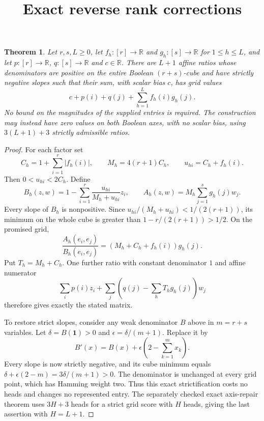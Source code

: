 \documentclass[11pt]{article}
\newtheorem{theorem}{Theorem}
\begin{document}
\title{Exact reverse rank corrections}
\author{}
\date{}
\maketitle

\begin{theorem}
Let $r,s,L\geq0$, let $f_h:[r]\to\mathbb R$ and
$g_h:[s]\to\mathbb R$ for $1\leq h\leq L$, and let
$p:[r]\to\mathbb R$, $q:[s]\to\mathbb R$ and $c\in\mathbb R$.
There are $L+1$ affine ratios whose denominators are positive on the
entire Boolean $(r+s)$-cube and have strictly negative slopes such that
 their sum, with scalar bias $c$, has grid values
\[
 c+p(i)+q(j)+\sum_{h=1}^L f_h(i)g_h(j).
\]
No bound on the magnitudes of the supplied entries is required.
The construction may instead have zero values on both Boolean axes,
with no scalar bias, using $3(L+1)+3$ strictly admissible ratios.
\end{theorem}

\begin{proof}
For each factor set
\[
 C_h=1+\sum_{i=1}^r|f_h(i)|,\qquad
 M_h=4(r+1)C_h,\qquad u_{hi}=C_h+f_h(i).
\]
Then $0<u_{hi}<2C_h$. Define
\[
 B_h(z,w)=1-\sum_{i=1}^r
       \frac{u_{hi}}{M_h+u_{hi}}z_i,\qquad
 A_h(z,w)=M_h\sum_{j=1}^s g_h(j)w_j.
\]
Every slope of $B_h$ is nonpositive. Since
$u_{hi}/(M_h+u_{hi})<1/(2(r+1))$, its minimum on the whole cube
is greater than $1-r/(2(r+1))>1/2$. On the promised grid,
\[
 \frac{A_h(e_i,e_j)}{B_h(e_i,e_j)}
  =(M_h+C_h+f_h(i))g_h(j).
\]
Put $T_h=M_h+C_h$. One further ratio with constant denominator $1$
and affine numerator
\[
 \sum_i p(i)z_i+
 \sum_j\left(q(j)-\sum_hT_hg_h(j)\right)w_j
\]
therefore gives exactly the stated matrix.

To restore strict slopes, consider any weak denominator $B$ above
in $m=r+s$ variables. Let $\delta=B(\boldsymbol1)>0$ and
$\epsilon=\delta/(m+1)$. Replace it by
\[
 B'(x)=B(x)+\epsilon\left(2-\sum_{k=1}^m x_k\right).
\]
Every slope is now strictly negative, and its cube minimum equals
$\delta+\epsilon(2-m)=3\delta/(m+1)>0$. The denominator is
unchanged at every grid point, which has Hamming weight two.
Thus this exact strictification costs no heads and changes no
represented entry. The separately checked exact axis-repair theorem
uses $3H+3$ heads for a strict grid score with $H$ heads, giving the
last assertion with $H=L+1$.
\end{proof}
\end{document}
